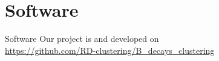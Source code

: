 \section{Software}
\begin{frame}{Software}
    Our project is  and  developed on
    \\
    {\color{purple}\url{https://github.com/RD-clustering/B_decays_clustering}}
    

\end{frame}
